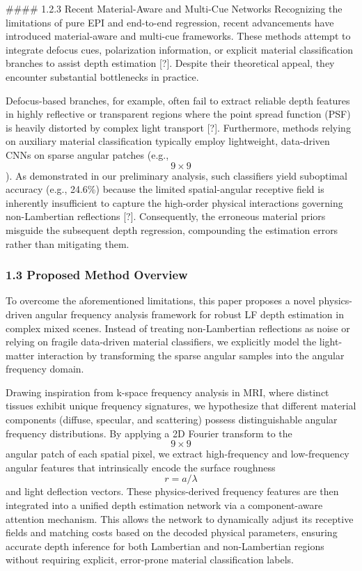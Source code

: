 \#\#\#\# 1.2.3 Recent Material-Aware and Multi-Cue Networks
Recognizing the limitations of pure EPI and end-to-end regression, recent advancements have introduced material-aware and multi-cue frameworks. These methods attempt to integrate defocus cues, polarization information, or explicit material classification branches to assist depth estimation [?]. Despite their theoretical appeal, they encounter substantial bottlenecks in practice. 

Defocus-based branches, for example, often fail to extract reliable depth features in highly reflective or transparent regions where the point spread function (PSF) is heavily distorted by complex light transport [?]. Furthermore, methods relying on auxiliary material classification typically employ lightweight, data-driven CNNs on sparse angular patches (e.g., \[
9 \times 9
\]). As demonstrated in our preliminary analysis, such classifiers yield suboptimal accuracy (e.g., 24.6\%) because the limited spatial-angular receptive field is inherently insufficient to capture the high-order physical interactions governing non-Lambertian reflections [?]. Consequently, the erroneous material priors misguide the subsequent depth regression, compounding the estimation errors rather than mitigating them.

\subsubsection{1.3 Proposed Method Overview}

To overcome the aforementioned limitations, this paper proposes a novel physics-driven angular frequency analysis framework for robust LF depth estimation in complex mixed scenes. Instead of treating non-Lambertian reflections as noise or relying on fragile data-driven material classifiers, we explicitly model the light-matter interaction by transforming the sparse angular samples into the angular frequency domain. 

Drawing inspiration from k-space frequency analysis in MRI, where distinct tissues exhibit unique frequency signatures, we hypothesize that different material components (diffuse, specular, and scattering) possess distinguishable angular frequency distributions. By applying a 2D Fourier transform to the \[
9 \times 9
\] angular patch of each spatial pixel, we extract high-frequency and low-frequency angular features that intrinsically encode the surface roughness \[
r = a/\lambda
\] and light deflection vectors. These physics-derived frequency features are then integrated into a unified depth estimation network via a component-aware attention mechanism. This allows the network to dynamically adjust its receptive fields and matching costs based on the decoded physical parameters, ensuring accurate depth inference for both Lambertian and non-Lambertian regions without requiring explicit, error-prone material classification labels.

